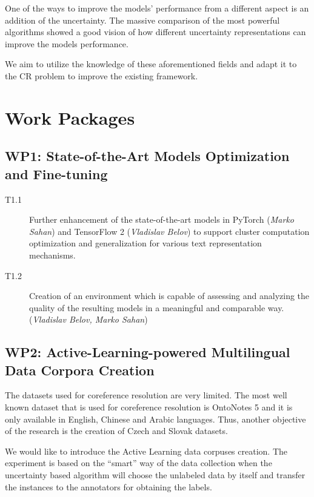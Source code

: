 One of the ways to improve the models' performance from a different aspect is an addition of the uncertainty. The massive comparison of the most powerful algorithms \cite{ovadia2019can} showed a good vision of how different uncertainty representations can improve the models performance.  

We aim to utilize the knowledge of these aforementioned fields and adapt it to the CR problem to improve the existing framework.

\section{Work Packages}\label{sec:wp}

\subsection*{WP1: State-of-the-Art Models Optimization and Fine-tuning}

\begin{description}
	\item [T1.1] Further enhancement of the state-of-the-art models in PyTorch (\textit{Marko Sahan}) and TensorFlow 2 (\textit{Vladislav Belov}) to support cluster computation optimization and generalization for various text representation mechanisms.
	\item [T1.2] Creation of an environment which is capable of assessing and analyzing the quality of the resulting models in a meaningful and comparable way. (\textit{Vladislav Belov, Marko Sahan})

\end{description}


\subsection*{WP2: Active-Learning-powered Multilingual Data Corpora Creation}

 The datasets used for coreference resolution are very limited. The most well known dataset that is used for coreference resolution is OntoNotes 5 \cite{ontonotes5-Weischedel2013} and it is only available in English, Chinese and Arabic languages. Thus, another objective of the research is the creation of Czech and Slovak datasets.

We would like to introduce the Active Learning data corpuses creation. The experiment is based on the “smart” way of the data collection when the uncertainty based algorithm will choose the unlabeled data by itself and transfer the instances to the annotators for obtaining the labels. 

